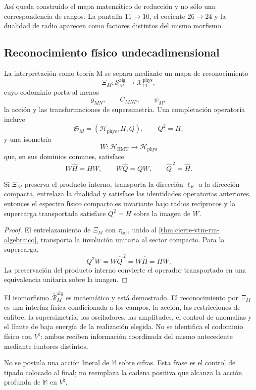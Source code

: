 Así queda construido el mapa matemático de reducción y no sólo una
correspondencia de rangos. La pantalla \(11\to10\), el cociente
\(26\to24\) y la dualidad de radio aparecen como factores distintos del
mismo morfismo.

\subsection{Reconocimiento físico undecadimensional}

La interpretación como teoría M se separa mediante un mapa de reconocimiento
\[
 \Xi_M:\mathscr S_M^{\mathrm{alg}}
 \longrightarrow\mathcal X_{11}^{\mathrm{phys}},
\]
cuyo codominio porta al menos
\[
 g_{MN},\qquad C_{MNP},\qquad\psi_M,
\]
la acción y las transformaciones de supersimetría. Una completación
operatoria incluye
\[
 \mathfrak S_M=(\mathcal H_{\mathrm{phys}},H,Q),
 \qquad Q^2=H,
\]
y una isometría
\[
 W:\mathcal H_{\mathrm{HMT}}\longrightarrow\mathcal H_{\mathrm{phys}}
\]
que, en sus dominios comunes, satisface
\[
 W\widehat H=HW,
 \qquad W\widehat Q=QW,
 \qquad \widehat Q^{\,2}=\widehat H.
\]

\begin{theorem}
\label{thm:cierre-vtm-reconocimiento-fisico-m}
Si \(\Xi_M\) preserva el producto interno, transporta la dirección
\(\ell_K\) a la dirección compacta, entrelaza la dualidad y satisface las
identidades operatorias anteriores, entonces el espectro físico compacto es
invariante bajo radios recíprocos y la supercarga transportada satisface
\(Q^2=H\) sobre la imagen de \(W\).
\end{theorem}

\begin{proof}
El entrelazamiento de \(\Xi_M\) con \(\tau_{\mathrm{tar}}\), unido al
\cref{thm:cierre-vtm-rm-algebraico}, transporta la involución unitaria al
sector compacto. Para la supercarga,
\[
 Q^2W=W\widehat Q^{\,2}=W\widehat H=HW.
\]
La preservación del producto interno convierte el operador transportado en
una equivalencia unitaria sobre la imagen.
\end{proof}

El isomorfismo
\(\overline{\mathcal R}_M^{\mathrm{alg}}\) es matemático y está demostrado.
El reconocimiento por \(\Xi_M\) es una interfaz física condicionada a los
campos, la acción, las restricciones de calibre, la supersimetría, los
osciladores, las amplitudes, el control de anomalías y el límite de baja
energía de la realización elegida. No se identifica el codominio físico con
\(V^\natural\): ambos reciben información coordinada del mismo antecedente
mediante funtores distintos.

No se postula una acción literal de \(\mathbb M\) sobre cifras. Esta frase es
el control de tipado colocado al final; no reemplaza la cadena positiva que
alcanza la acción profunda de \(\mathbb M\) en \(V^\natural\).
